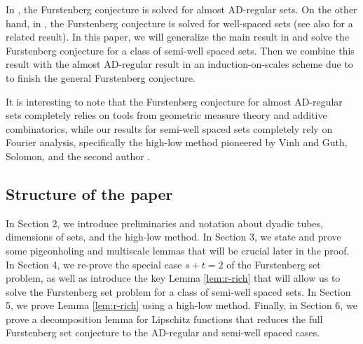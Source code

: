 \documentclass{amsart}
\begin{document}



In \cite{orponen2023projections}, the Furstenberg conjecture is solved for almost AD-regular sets. On the other hand, in \cite{guth2019incidence}, the Furstenberg conjecture is solved for well-spaced sets (see also \cite{fu2022incidence} for a related result). In this paper, we will generalize the main result in \cite{guth2019incidence} and solve the Furstenberg conjecture for a class of semi-well spaced sets. Then we combine this result with the almost AD-regular result in an induction-on-scales scheme due to \cite{orponen2021hausdorff} to finish the general Furstenberg conjecture.

It is interesting to note that the Furstenberg conjecture for almost AD-regular sets completely relies on tools from geometric measure theory and additive combinatorics, while our results for semi-well spaced sets completely rely on Fourier analysis, specifically the high-low method pioneered by
Vinh \cite{vinh2011szemeredi} and Guth, Solomon, and the second author \cite{guth2019incidence}.

\subsection{Structure of the paper}
In Section 2, we introduce preliminaries and notation about dyadic tubes, dimensions of sets, and the high-low method. In Section 3, we state and prove some pigeonholing and multiscale lemmas that will be crucial later in the proof. In Section 4, we re-prove the special case $s + t = 2$ of the Furstenberg set problem, as well as introduce the key Lemma \ref{lem:r-rich} that will allow us to solve the Furstenberg set problem for a class of semi-well spaced sets. In Section 5, we prove Lemma \ref{lem:r-rich} using a high-low method. Finally, in Section 6, we prove a decomposition lemma for Lipschitz functions that reduces the full Furstenberg set conjecture to the AD-regular and semi-well spaced cases.
\end{document}
